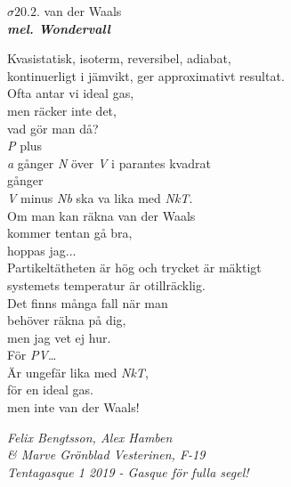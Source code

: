 \documentclass[a6paper,10pt]{article}
\newcommand{\mel}[1]{\small\textbf{\textit{mel. #1 \\}}}
\begin{document}
\setlength{\oddsidemargin}{-0.47in}

\begin{center}
\Large $\sigma20.2$. van der Waals\\
\mel{Wondervall} 
\end{center}
\small Kvasistatisk, isoterm, reversibel, adiabat,\\
kontinuerligt i jämvikt, ger approximativt resultat.\\
Ofta antar vi ideal gas,\\
men räcker inte det, \\
vad gör man då?
\vspace{5pt}\\
\textit{P} plus \\
\textit{a} gånger \textit{N} över \textit{V} i parantes kvadrat\\
gånger \\
\textit{V} minus \textit{Nb} ska va lika med \textit{NkT}.\\
Om man kan räkna van der Waals\\
kommer tentan gå bra,\\
hoppas jag...
\vspace{5pt}\\
Partikeltätheten är hög och trycket är mäktigt\\
systemets temperatur är otillräcklig.\\
Det finns många fall när man\\
behöver räkna på dig,\\
men jag vet ej hur.
\vspace{5pt}\\
För \textit{PV}… \\
Är ungefär lika med \textit{NkT},\\
för en ideal gas.\\
men inte van der Waals!

\begin{flushright}
\textit{Felix Bengtsson, Alex Hamben \\ \& Marve Grönblad Vesterinen, F-19 \\Tentagasque 1 2019 - Gasque för fulla segel!}
\end{flushright}

\setlength{\oddsidemargin}{-0.47in}
\end{document}

